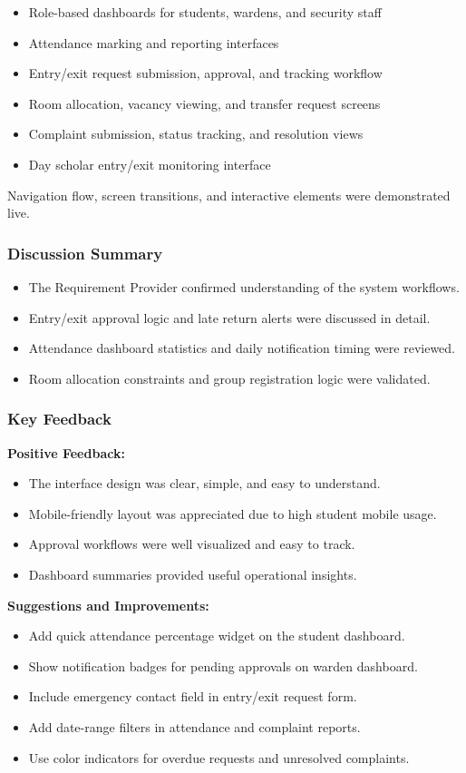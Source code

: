 \documentclass[12pt]{article}
\begin{document}
\begin{itemize}
\item Role-based dashboards for students, wardens, and security staff
\item Attendance marking and reporting interfaces
\item Entry/exit request submission, approval, and tracking workflow
\item Room allocation, vacancy viewing, and transfer request screens
\item Complaint submission, status tracking, and resolution views
\item Day scholar entry/exit monitoring interface
\end{itemize}

Navigation flow, screen transitions, and interactive elements were demonstrated live.

\subsubsection{Discussion Summary}
\begin{itemize}
\item The Requirement Provider confirmed understanding of the system workflows.
\item Entry/exit approval logic and late return alerts were discussed in detail.
\item Attendance dashboard statistics and daily notification timing were reviewed.
\item Room allocation constraints and group registration logic were validated.
\end{itemize}

\subsubsection{Key Feedback}
\textbf{Positive Feedback:}
\begin{itemize}
\item The interface design was clear, simple, and easy to understand.
\item Mobile-friendly layout was appreciated due to high student mobile usage.
\item Approval workflows were well visualized and easy to track.
\item Dashboard summaries provided useful operational insights.
\end{itemize}

\textbf{Suggestions and Improvements:}
\begin{itemize}
\item Add quick attendance percentage widget on the student dashboard.
\item Show notification badges for pending approvals on warden dashboard.
\item Include emergency contact field in entry/exit request form.
\item Add date-range filters in attendance and complaint reports.
\item Use color indicators for overdue requests and unresolved complaints.
\end{itemize}
\end{document}
